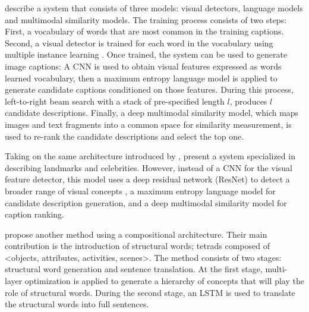 \citet{Fang2015} describe a system that consists of three models: visual detectors, language models and multimodal similarity models. The training process consists of two steps: First, a vocabulary of words that are most common in the training captions. Second, a visual detector is trained for each word in the vocabulary using multiple instance learning  \citep{Viola2005}. Once trained, the system can be used to generate image captions: A CNN \citep{Krizhevsky2012} is used to obtain visual features expressed as words learned vocabulary, then a maximum entropy language model \citep{Berger1996} is applied to generate candidate captions conditioned on those features. During this process, left-to-right beam search \citep{Ratnaparkhi2000} with a stack of pre-specified length $l$, produces $l$ candidate descriptions. Finally, a deep multimodal similarity model, which maps images and text fragments into a common space for similarity measurement, is used to re-rank the candidate descriptions and select the top one.

Taking on the same architecture introduced by \citet{Fang2015}, \citet{Tran2016} present a system specialized in describing landmarks and celebrities. However, instead of a CNN for the visual feature detector, this model uses a deep residual network (ResNet) to detect a broader range of visual concepts \cite{He2016a}, a maximum entropy language model for candidate description generation, and a deep multimodal similarity model for caption ranking. 

\citet{Ma2016} propose another method using a compositional architecture. Their main contribution is the introduction of structural words; tetrads composed of <objects, attributes, activities, scenes>. The method consists of two stages: structural word generation and sentence translation. At the first stage, multi-layer optimization is applied to generate a hierarchy of concepts that will play the role of structural words. During the second stage, an LSTM is used to translate the structural words into full sentences.


